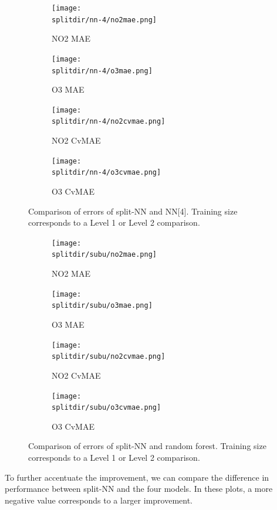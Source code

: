 \documentclass[journal abbreviation, manuscript]{copernicus}
\begin{document}
\begin{figure}[H]
\begin{subfigure}{0.49\textwidth}
\texttt{[image: \\splitdir/nn-4/no2mae.png]}
\caption{NO2 MAE}
\end{subfigure}
\begin{subfigure}{0.49\textwidth}
\texttt{[image: \\splitdir/nn-4/o3mae.png]}
\caption{O3 MAE}
\end{subfigure}
\begin{subfigure}{0.49\textwidth}
\texttt{[image: \\splitdir/nn-4/no2cvmae.png]}
\caption{NO2 CvMAE}
\end{subfigure}
\begin{subfigure}{0.49\textwidth}
\texttt{[image: \\splitdir/nn-4/o3cvmae.png]}
\caption{O3 CvMAE}
\end{subfigure}
\caption{Comparison of errors of split-NN and NN[4]. Training size corresponds to a Level 1 or Level 2 comparison.}
\end{figure}

\begin{figure}[H]
\begin{subfigure}{0.49\textwidth}
\texttt{[image: \\splitdir/subu/no2mae.png]}
\caption{NO2 MAE}
\end{subfigure}
\begin{subfigure}{0.49\textwidth}
\texttt{[image: \\splitdir/subu/o3mae.png]}
\caption{O3 MAE}
\end{subfigure}
\begin{subfigure}{0.49\textwidth}
\texttt{[image: \\splitdir/subu/no2cvmae.png]}
\caption{NO2 CvMAE}
\end{subfigure}
\begin{subfigure}{0.49\textwidth}
\texttt{[image: \\splitdir/subu/o3cvmae.png]}
\caption{O3 CvMAE}
\end{subfigure}
\caption{Comparison of errors of split-NN and random forest. Training size corresponds to a Level 1 or Level 2 comparison.}
\end{figure}

To further accentuate the improvement, we can compare
the difference in performance between split-NN and the four models. In these plots, a more negative value corresponds to a larger improvement.
\end{document}
